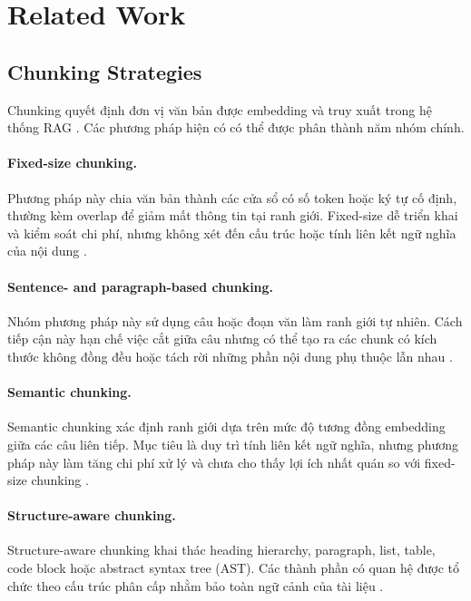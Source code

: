 
\section{Related Work}
\label{sec:related-work}

\subsection{Chunking Strategies}

Chunking quyết định đơn vị văn bản được embedding và truy xuất trong hệ thống RAG \citep{lewis-etal-2020-rag}. Các phương pháp hiện có có thể được phân thành năm nhóm chính.

\paragraph{Fixed-size chunking.}
Phương pháp này chia văn bản thành các cửa sổ có số token hoặc ký tự cố định, thường kèm overlap để giảm mất thông tin tại ranh giới. Fixed-size dễ triển khai và kiểm soát chi phí, nhưng không xét đến cấu trúc hoặc tính liên kết ngữ nghĩa của nội dung \citep{qu-etal-2025-semantic}.

\paragraph{Sentence- and paragraph-based chunking.}
Nhóm phương pháp này sử dụng câu hoặc đoạn văn làm ranh giới tự nhiên. Cách tiếp cận này hạn chế việc cắt giữa câu nhưng có thể tạo ra các chunk có kích thước không đồng đều hoặc tách rời những phần nội dung phụ thuộc lẫn nhau \citep{qu-etal-2025-semantic}.

\paragraph{Semantic chunking.}
Semantic chunking xác định ranh giới dựa trên mức độ tương đồng embedding giữa các câu liên tiếp. Mục tiêu là duy trì tính liên kết ngữ nghĩa, nhưng phương pháp này làm tăng chi phí xử lý và chưa cho thấy lợi ích nhất quán so với fixed-size chunking \citep{qu-etal-2025-semantic}.

\paragraph{Structure-aware chunking.}
Structure-aware chunking khai thác heading hierarchy, paragraph, list, table, code block hoặc abstract syntax tree (AST). Các thành phần có quan hệ được tổ chức theo cấu trúc phân cấp nhằm bảo toàn ngữ cảnh của tài liệu \citep{jain-etal-2025-autochunker}.

